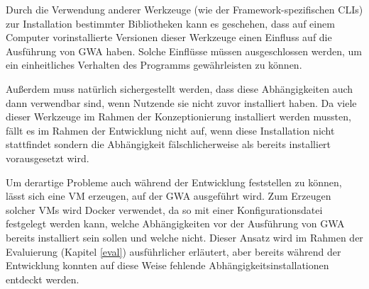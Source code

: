 Durch die Verwendung anderer Werkzeuge (wie der Framework-spezifischen \gls{CLI}s) zur Installation bestimmter Bibliotheken kann es geschehen, dass auf einem Computer vorinstallierte Versionen dieser Werkzeuge einen Einfluss auf die Ausführung von \gls{GWA} haben. Solche Einflüsse müssen ausgeschlossen werden, um ein einheitliches Verhalten des Programms gewährleisten zu können.

Außerdem muss natürlich sichergestellt werden, dass diese Abhängigkeiten auch dann verwendbar sind, wenn Nutzende sie nicht zuvor installiert haben. Da viele dieser Werkzeuge im Rahmen der Konzeptionierung installiert werden mussten, fällt es im Rahmen der Entwicklung nicht auf, wenn diese Installation nicht stattfindet sondern die Abhängigkeit fälschlicherweise als bereits installiert vorausgesetzt wird.

Um derartige Probleme auch während der Entwicklung feststellen zu können, lässt sich eine \gls{VM} erzeugen, auf der \gls{GWA} ausgeführt wird. Zum Erzeugen solcher \gls{VM}s wird Docker verwendet, da so mit einer Konfigurationsdatei festgelegt werden kann, welche Abhängigkeiten vor der Ausführung von \gls{GWA} bereits installiert sein sollen und welche nicht. Dieser Ansatz wird im Rahmen der Evaluierung (Kapitel \ref{eval}) ausführlicher erläutert, aber bereits während der Entwicklung konnten auf diese Weise fehlende Abhängigkeitsinstallationen entdeckt werden.
